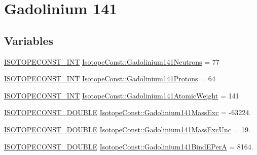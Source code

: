 \hypertarget{group___isotope_const-_gadolinium-_gd141}{}\section{Gadolinium 141}
\label{group___isotope_const-_gadolinium-_gd141}
\subsection*{Variables}
\begin{DoxyCompactItemize}
\item 
\mbox{\hyperlink{group___isotope_const-_macros_ga5f18360b3e99483a35c32d789e62621c}{I\+S\+O\+T\+O\+P\+E\+C\+O\+N\+S\+T\+\_\+\+I\+NT}} \mbox{\hyperlink{group___isotope_const-_gadolinium-_gd141_ga65fb25d9d807d50a2f3fcb0e9636d10b}{Isotope\+Const\+::\+Gadolinium141\+Neutrons}} = 77
\item 
\mbox{\hyperlink{group___isotope_const-_macros_ga5f18360b3e99483a35c32d789e62621c}{I\+S\+O\+T\+O\+P\+E\+C\+O\+N\+S\+T\+\_\+\+I\+NT}} \mbox{\hyperlink{group___isotope_const-_gadolinium-_gd141_gabe4b22f6970a3dc8afb6d86fd8b4e431}{Isotope\+Const\+::\+Gadolinium141\+Protons}} = 64
\item 
\mbox{\hyperlink{group___isotope_const-_macros_ga5f18360b3e99483a35c32d789e62621c}{I\+S\+O\+T\+O\+P\+E\+C\+O\+N\+S\+T\+\_\+\+I\+NT}} \mbox{\hyperlink{group___isotope_const-_gadolinium-_gd141_gaad94327febc7d053ce85c69cca22309f}{Isotope\+Const\+::\+Gadolinium141\+Atomic\+Weight}} = 141
\item 
\mbox{\hyperlink{group___isotope_const-_macros_ga8f45a7272ce02c0b4c65c44636ed719a}{I\+S\+O\+T\+O\+P\+E\+C\+O\+N\+S\+T\+\_\+\+D\+O\+U\+B\+LE}} \mbox{\hyperlink{group___isotope_const-_gadolinium-_gd141_ga98f54b2095c3e3fdca46147b08db3417}{Isotope\+Const\+::\+Gadolinium141\+Mass\+Exc}} = -\/63224.
\item 
\mbox{\hyperlink{group___isotope_const-_macros_ga8f45a7272ce02c0b4c65c44636ed719a}{I\+S\+O\+T\+O\+P\+E\+C\+O\+N\+S\+T\+\_\+\+D\+O\+U\+B\+LE}} \mbox{\hyperlink{group___isotope_const-_gadolinium-_gd141_ga5f7a96938bace0be00e2c66b40bfbc89}{Isotope\+Const\+::\+Gadolinium141\+Mass\+Exc\+Unc}} = 19.
\item 
\mbox{\hyperlink{group___isotope_const-_macros_ga8f45a7272ce02c0b4c65c44636ed719a}{I\+S\+O\+T\+O\+P\+E\+C\+O\+N\+S\+T\+\_\+\+D\+O\+U\+B\+LE}} \mbox{\hyperlink{group___isotope_const-_gadolinium-_gd141_ga53bbc8ced38f804a8dc48cfe383c4993}{Isotope\+Const\+::\+Gadolinium141\+Bind\+E\+PerA}} = 8164.

\end{DoxyCompactItemize}
